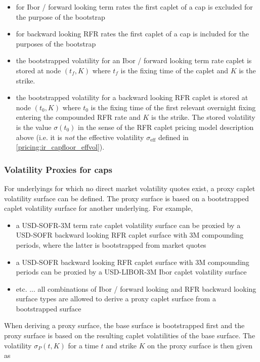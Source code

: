 \begin{itemize}
\item for Ibor / forward looking term rates the first caplet of a cap is excluded for the purpose of the bootstrap
\item for backward looking RFR rates the first caplet of a cap is included for the purposes of the bootstrap
\item the bootstrapped volatility for an Ibor / forward looking term rate caplet is stored at node $(t_f, K)$ where
  $t_f$ is the fixing time of the caplet and $K$ is the strike.
\item the bootstrapped volatility for a backward looking RFR caplet is stored at node $(t_0, K)$ where $t_0$ is the
  fixing time of the first relevant overnight fixing entering the compounded RFR rate and $K$ is the strike. The stored
  volatility is the value $\sigma(t_0)$ in the sense of the RFR caplet pricing model description above (i.e. it is {\em
    not} the effective volatility $\sigma_\text{eff}$ defined in \ref{pricing:ir_capfloor_effvol}).
\end{itemize}

\subsubsection{Volatility Proxies for caps}
\label{pricing:ir_capfloor_proxying}

For underlyings for which no direct market volatility quotes exist, a proxy caplet volatility surface can be
defined. The proxy surface is based on a bootstrapped caplet volatility surface for another underlying. For example,

\begin{itemize}
\item a USD-SOFR-3M term rate caplet volatility surface can be proxied by a USD-SOFR backward looking RFR caplet surface
  with 3M compounding periods, where the latter is bootstrapped from market quotes
\item a USD-SOFR backward looking RFR caplet surface with 3M compounding periods can be proxied by a USD-LIBOR-3M Ibor
  caplet volatility surface
  \item etc. ... all combinations of Ibor / forward looking and RFR backward looking surface types are allowed to derive
    a proxy caplet surface from a bootstrapped surface
\end{itemize}

When deriving a proxy surface, the base surface is bootstrapped first and the proxy surface is based on the resulting
caplet volatilities of the base surface. The volatility $\sigma_P(t, K)$ for a time $t$ and strike $K$ on the proxy
surface is then given as

